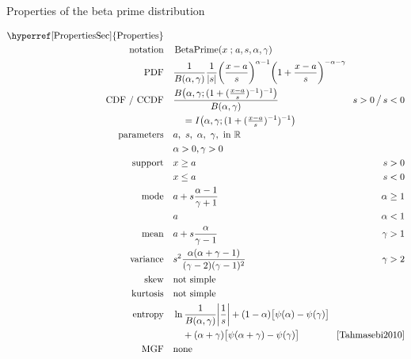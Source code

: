 

\begin{table*}[tp]
\caption[Beta prime distribution -- Properties] {Properties of the beta prime distribution}
\begin{align*}
 \text{\hyperref[PropertiesSec]{Properties}}  \quad& \\
\text{notation} \quad & \op{BetaPrime}(x\given a, s, \alpha,\gamma)  	\checked
\\
\text{PDF}\quad &    \frac{1}{B(\alpha, \gamma)} \frac{1}{|s|}
\Left(\frac{x-a}{s}\Right)^{\alpha -1} \Left(1+ \frac{x-a}{s} \Right)^{-\alpha-\gamma } \checked
\hspace{-2em}
\\
\text{CDF / CCDF} \quad  &  
\frac{B\big(\alpha, \gamma; (1+(\tfrac{x-a}{s})^{-1})^{-1} \big) }{B(\alpha,\gamma)} \checked
\hspace{-8em}
& s >0 \,\big/ \, s<0
\\ 
& \quad = I\Left(  \alpha,\gamma; (1+(\tfrac{x-a}{s})^{-1})^{-1} \Right) 			\checked
\\
\text{parameters}\quad &   a,\ s,\ \alpha,\ \gamma, \text{ in } \Real \checked 
\\ & \alpha>0, \gamma>0 \checked
\\
\text{support} \quad &    x \geq a &  s > 0 			\checked
\\
&  x\leq a  &  s < 0 							\checked
\\
\text{mode} \quad  & a + s \frac{\alpha-1}{\gamma+1} & \alpha\geq 1 \checked \\
& a &\alpha<1 \checked
\\
\text{mean} \quad  &   a+s \frac{ \alpha}{\gamma-1} \checked
& \gamma >1
\\
\text{variance} \quad  &s^2
\frac{\alpha(\alpha+\gamma-1)}{(\gamma-2)(\gamma-1)^2} \checked
  \hspace{-8em}
&   \gamma>2
\\
\text{skew} \quad  &  \text{not simple}
\\
\text{kurtosis} \quad  &  \text{not simple}
\\
\text{entropy} \quad  &   \ln \frac{1}{B(\alpha, \gamma)} \Left|\frac{1}{s}\Right|
  +(1-\alpha) \big[ \psi(\alpha) - \psi(\gamma)\big]
  \hspace{-8em}
\\
& \quad +(\alpha+\gamma) \big[ \psi(\alpha+\gamma) - \psi(\gamma)\big] \checked &  \text{\cite[Eq.~(15)]{Tahmasebi2010}}
\\
\text{MGF} \quad  &  \text{none}
\end{align*}
\end{table*}


